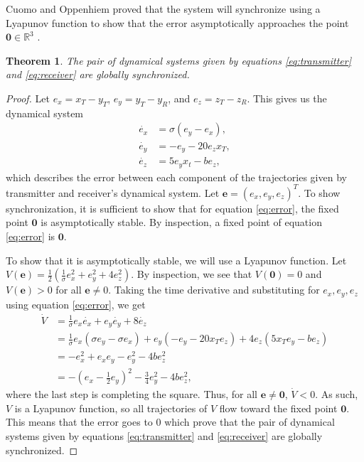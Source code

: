 \documentclass[12pt]{article}
\newtheorem{theorem}{Theorem}[section]
\begin{document}
    Cuomo and Oppenhiem proved that the system will synchronize using a Lyapunov function to show that the error asymptotically approaches the point $\mathbf{0} \in \mathbb{R}^3$ \cite{cuomo1993}. 
      \begin{theorem}\label{thm:synchronize}
        The pair of dynamical systems given by equations \ref{eq:transmitter} and \ref{eq:receiver} are globally synchronized. 
      \end{theorem}
      \begin{proof} 
       Let $e_x = x_T - y_T$, $e_y = y_T - y_R$, and $e_z = z_T - z_R$. This gives us the dynamical system 
       \begin{equation}\label{eq:error}
        \begin{aligned}
         \dot{e_x} &= \sigma (e_y - e_x), \\ 
         \dot{e_y} &= -e_y - 20e_z x_T, \\
         \dot{e_z} &= 5e_y x_t - be_z,  
        \end{aligned} 
       \end{equation}
       which describes the error between each component of the trajectories given by transmitter and receiver's dynamical system. Let $\mathbf{e} = (e_x,e_y,e_z)^T$. To show synchronization, it is sufficient to show that for equation \ref{eq:error}, the fixed point $\mathbf{0}$ is asymptotically stable. By inspection, a fixed point of equation \ref{eq:error} is $\mathbf{0}$. 
       
       To show that it is asymptotically stable, we will use a Lyapunov function. Let $V(\mathbf{e}) = \frac{1}{2} \left( \frac{1}{\sigma} e_x^2 + e_y^2 + 4e_z^2 \right)$. By inspection, we see that $V(\mathbf{0}) = 0$ and $V(\mathbf{e}) > 0$ for all $\mathbf{e} \neq 0$. Taking the time derivative and substituting for $e_x,e_y,e_z$ using equation \ref{eq:error}, we get 
       \begin{align*} 
         \dot{V} &= \frac{1}{\sigma} e_x \dot{e_x} + e_y \dot{e_y} + 8 \dot{e_z} \\
         &= \frac{1}{\sigma} e_x (\sigma e_y - \sigma e_x) + e_y (-e_y - 20x_T e_z) + 4 e_z (5x_T e_y - be_z) \\ 
         &= -e_x^2 + e_x e_y - e_y^2 - 4be_z^2 \\
         &= - \left( e_x - \frac{1}{2}e_y \right)^2 - \frac{3}{4} e_y^2 - 4be_z^2,
       \end{align*}
       where the last step is completing the square. Thus, for all $\mathbf{e} \neq \mathbf{0}$, $\dot{V} < 0$. As such, $V$ is a Lyapunov function, so all trajectories of $V$ flow toward the fixed point $\mathbf{0}$. This means that the error goes to $0$ which prove that the pair of dynamical systems given by equations \ref{eq:transmitter} and \ref{eq:receiver} are globally synchronized.
      \end{proof}
\end{document}
